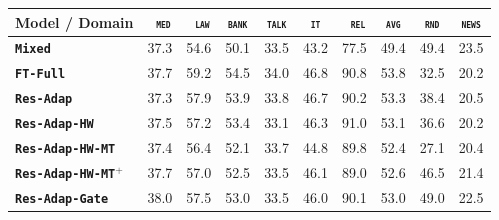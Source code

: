 \documentclass[11pt,a4paper]{article}
\newcommand{\domain}[1]{\texttt{\textsc{#1}}}
\newcommand{\system}[1]{\texttt{\textbf{#1}}}
\begin{document}
\begin{table}[htbp]
  \centering
  \begin{tabular}{|p{3.5cm}|*{7}{r|}|r|r|} \hline
    Model / Domain & \multicolumn{1}{c|}{\domain{ med}} & \multicolumn{1}{c|}{\domain{ law}} & \multicolumn{1}{c|}{\domain{bank}} & \multicolumn{1}{c|}{\domain{talk}} & \multicolumn{1}{c|}{\domain{ it }} & \multicolumn{1}{c|}{\domain{ rel}} & \multicolumn{1}{c||}{\domain{avg}} & \multicolumn{1}{c|}{\domain{rnd}} & \multicolumn{1}{c|}{\domain{news}}
\\ \hline %
    \system{Mixed}             & 37.3 & 54.6 & 50.1 & 33.5 & 43.2 & 77.5     &  49.4 & 49.4 & 23.5 \\ %
    \system{FT-Full}             & 37.7 & 59.2 & 54.5 & 34.0 & 46.8 & 90.8   & 53.8 & 32.5 & 20.2 \\ %
    \system{Res-Adap}         & 37.3 & 57.9 & 53.9 & 33.8 & 46.7 & 90.2   & 53.3 & 38.4 & 20.5 \\ %
    \system{Res-Adap-HW}   & 37.5 & 57.2 & 53.4 & 33.1 & 46.3 & 91.0  & 53.1 & 36.6 & 20.2 \\ %
    \system{Res-Adap-HW-MT} & 37.4 & 56.4 & 52.1 & 33.7 & 44.8 & 89.8 & 52.4 & 27.1 & 20.4 \\ %
    \system{Res-Adap-HW-MT}$^{+}$ & 37.7 & 57.0 & 52.5 & 33.5 & 46.1 & 89.0 & 52.6 & 46.5 & 21.4 \\ %
    \system{Res-Adap-Gate}  & 38.0 & 57.5& 53.0 & 33.5 & 46.0 & 90.1  & 53.0 & 49.0 & 22.5 \\ %

\end{tabular}
\end{table}
\end{document}
